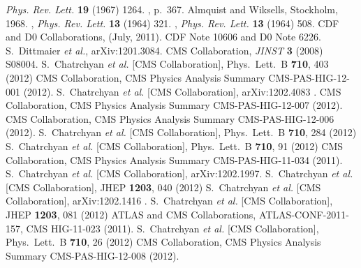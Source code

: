 \documentclass{cimento}
\begin{document}
\begin{thebibliography}{0}




 \textit{ Phys. Rev. Lett.} \textbf{ 19} (1967) 1264.
, p.~367.
\newblock Almquist and Wiksells, Stockholm, 1968.
, \textit{ Phys. Rev. Lett.} \textbf{ 13} (1964) 321.
, \textit{ Phys. Rev. Lett.} \textbf{ 13} (1964) 508.
 {CDF and D0 Collaborations}, (July, 2011). {CDF Note 10606 and D0 Note 6226}.
 S.~Dittmaier {\it et al.}, arXiv:1201.3084.
 CMS Collaboration, \textit{JINST} \textbf{3} (2008) S08004.
  S.~Chatrchyan {\it et al.}  [CMS Collaboration], Phys.\ Lett.\  B {\bf 710}, 403 (2012)
 CMS Collaboration, CMS Physics Analysis Summary CMS-PAS-HIG-12-001 (2012).
 S.~Chatrchyan {\it et al.}  [CMS Collaboration], arXiv:1202.4083 .
 CMS Collaboration, CMS Physics Analysis Summary CMS-PAS-HIG-12-007 (2012).
 CMS Collaboration, CMS Physics Analysis Summary CMS-PAS-HIG-12-006 (2012).
 S.~Chatrchyan {\it et al.}  [CMS Collaboration], Phys.\ Lett.\  B {\bf 710}, 284 (2012)
 S.~Chatrchyan {\it et al.}  [CMS Collaboration], Phys.\ Lett.\  B {\bf 710}, 91 (2012)
 CMS Collaboration, CMS Physics Analysis Summary CMS-PAS-HIG-11-034 (2011).
 S.~Chatrchyan {\it et al.}  [CMS Collaboration], arXiv:1202.1997.
 S.~Chatrchyan {\it et al.}  [CMS Collaboration], JHEP {\bf 1203}, 040 (2012)
 S.~Chatrchyan {\it et al.}  [CMS Collaboration], arXiv:1202.1416 .
 S.~Chatrchyan {\it et al.}  [CMS Collaboration], JHEP {\bf 1203}, 081 (2012)
 ATLAS and CMS Collaborations, ATLAS-CONF-2011-157, CMS HIG-11-023 (2011).
 S.~Chatrchyan {\it et al.}  [CMS Collaboration], Phys.\ Lett.\  B {\bf 710}, 26 (2012)
 CMS Collaboration, CMS Physics Analysis Summary CMS-PAS-HIG-12-008 (2012).
\end{thebibliography}
\end{document}
